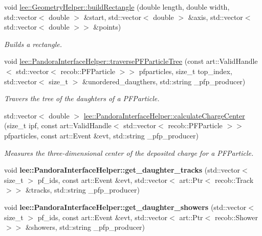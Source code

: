 \begin{DoxyCompactItemize}
void \hyperlink{group__lee_ga403b726646563c7fa8bce4c316226e15}{lee\-::\-Geometry\-Helper\-::build\-Rectangle} (double length, double width, std\-::vector$<$ double $>$ \&start, std\-::vector$<$ double $>$ \&axis, std\-::vector$<$ std\-::vector$<$ double $>$$>$ \&points)
\begin{DoxyCompactList}\small\item\em Builds a rectangle. \end{DoxyCompactList}\item 
void \hyperlink{group__lee_ga5f3e6eecea4f75ea9eea31e520b4f0bc}{lee\-::\-Pandora\-Interface\-Helper\-::traverse\-P\-F\-Particle\-Tree} (const art\-::\-Valid\-Handle$<$ std\-::vector$<$ recob\-::\-P\-F\-Particle $>$$>$ pfparticles, size\-\_\-t top\-\_\-index, std\-::vector$<$ size\-\_\-t $>$ \&unordered\-\_\-daugthers, std\-::string \-\_\-pfp\-\_\-producer)
\begin{DoxyCompactList}\small\item\em Travers the tree of the daughters of a P\-F\-Particle. \end{DoxyCompactList}\item 
std\-::vector$<$ double $>$ \hyperlink{group__lee_ga367b3ad86924343d3ab54fa8c84091af}{lee\-::\-Pandora\-Interface\-Helper\-::calculate\-Charge\-Center} (size\-\_\-t ipf, const art\-::\-Valid\-Handle$<$ std\-::vector$<$ recob\-::\-P\-F\-Particle $>$$>$ pfparticles, const art\-::\-Event \&evt, std\-::string \-\_\-pfp\-\_\-producer)
\begin{DoxyCompactList}\small\item\em Measures the three-\/dimensional center of the deposited charge for a P\-F\-Particle. \end{DoxyCompactList}\item 
\hypertarget{group__lee_ga30273cdf4f136187b522c237e61b864e}{void {\bfseries lee\-::\-Pandora\-Interface\-Helper\-::get\-\_\-daughter\-\_\-tracks} (std\-::vector$<$ size\-\_\-t $>$ pf\-\_\-ids, const art\-::\-Event \&evt, std\-::vector$<$ art\-::\-Ptr$<$ recob\-::\-Track $>$$>$ \&tracks, std\-::string \-\_\-pfp\-\_\-producer)}\label{group__lee_ga30273cdf4f136187b522c237e61b864e}

\item 
\hypertarget{group__lee_ga2219037e4e0677d9aeb55e9615b19131}{void {\bfseries lee\-::\-Pandora\-Interface\-Helper\-::get\-\_\-daughter\-\_\-showers} (std\-::vector$<$ size\-\_\-t $>$ pf\-\_\-ids, const art\-::\-Event \&evt, std\-::vector$<$ art\-::\-Ptr$<$ recob\-::\-Shower $>$$>$ \&showers, std\-::string \-\_\-pfp\-\_\-producer)}\label{group__lee_ga2219037e4e0677d9aeb55e9615b19131}


\end{DoxyCompactItemize}
